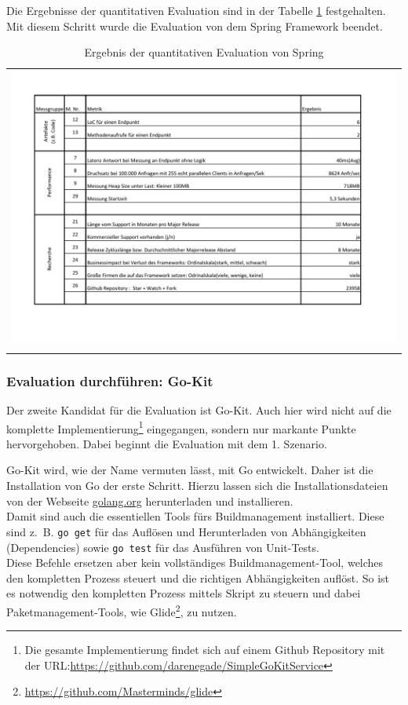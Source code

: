 Die Ergebnisse der quantitativen Evaluation sind in der Tabelle \ref{QuantErgebnisSpring} festgehalten. Mit diesem Schritt wurde die Evaluation von dem Spring Framework beendet.  

\begin{longtable}{c}
	\includegraphics[width=\linewidth]{Bilder/ObjekEvalErgebnisSpring.pdf} \\	
	\caption[Quantitative Evaluation Ergebnis Spring]{Ergebnis der quantitativen Evaluation von Spring}
	\label{QuantErgebnisSpring}\\
\end{longtable}
\FloatBarrier

\subsubsection{Evaluation durchführen: Go-Kit}
Der zweite Kandidat für die Evaluation ist Go-Kit. Auch hier wird nicht auf die komplette Implementierung\footnote{
	Die gesamte Implementierung findet sich auf einem Github Repository mit der URL:\url{https://github.com/darenegade/SimpleGoKitService}
} 
 eingegangen, sondern nur markante Punkte hervorgehoben. Dabei beginnt die Evaluation mit dem 1. Szenario.

Go-Kit wird, wie der Name vermuten lässt, mit Go entwickelt. Daher ist die Installation von Go der erste Schritt. Hierzu lassen sich die Installationsdateien von der Webseite \url{golang.org} herunterladen und installieren.\\
Damit sind auch die essentiellen Tools fürs Buildmanagement installiert. Diese sind z.~B. \lstinline|go get| für das Auflösen und Herunterladen von Abhängigkeiten (Dependencies) sowie \lstinline|go test| für das Ausführen von Unit-Tests.\\
Diese Befehle ersetzen aber kein vollständiges Buildmanagement-Tool, welches den kompletten Prozess steuert und die richtigen Abhängigkeiten auflöst\cite{GoDep2016}. So ist es notwendig den kompletten Prozess mittels Skript zu steuern und dabei Paketmanagement-Tools, wie Glide\footnote{\url{https://github.com/Masterminds/glide}}, zu nutzen.

